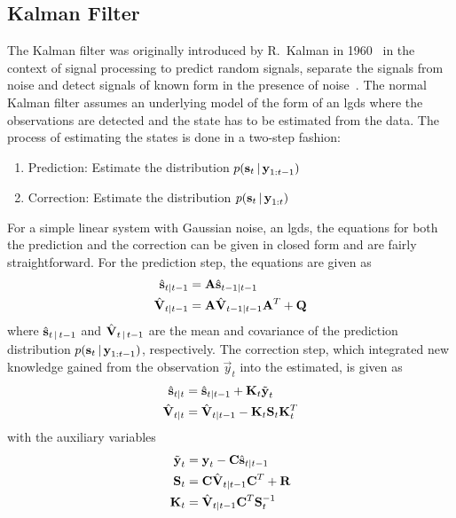 	\subsection{Kalman Filter}
		The Kalman filter was originally introduced by R.~Kalman in 1960~\cite{kalmanNewApproachLinear1960} in the context of signal processing to predict random signals, separate the signals from noise and detect signals of known form in the presence of noise~\cite{kalmanNewApproachLinear1960}. The normal Kalman filter assumes an underlying model of the form of an \ac{lgds} where the observations are detected and the state has to be estimated from the data. The process of estimating the states is done in a two-step fashion:
		\begin{enumerate}
			\item Prediction: \tabto{2.5cm} Estimate the distribution \( p(\boldsymbol{\mathrm{s}}_t \,\vert\, \boldsymbol{\mathrm{y}}_{1:t - 1}) \)
			\item Correction: \tabto{2.5cm} Estimate the distribution \( p(\boldsymbol{\mathrm{s}}_t \,\vert\, \boldsymbol{\mathrm{y}}_{1:t}) \)
		\end{enumerate}
		For a simple linear system with Gaussian noise, \ie an \ac{lgds}, the equations for both the prediction and the correction can be given in closed form and are fairly straightforward. For the prediction step, the equations are given as
		\begin{align}
			\hat{\boldsymbol{\mathrm{s}}}_{t \vert t - 1} &= \boldsymbol{\mathrm{A}} \hat{\boldsymbol{\mathrm{s}}}_{t - 1 \vert t - 1}  \label{eqn:kfStatePre} \\
			\hat{\boldsymbol{\mathrm{V}}}_{t \vert t - 1} &= \boldsymbol{\mathrm{A}} \hat{\boldsymbol{\mathrm{V}}}_{t - 1 \vert t - 1} \boldsymbol{\mathrm{A}}^T + \boldsymbol{\mathrm{Q}}  \label{eqn:kfCovPre}
		\end{align}
		where \( \hat{\boldsymbol{\mathrm{s}}}_{t \,\vert\, t - 1} \) and \( \hat{\boldsymbol{\mathrm{V}}}_{t \,\vert\, t - 1} \) are the mean and covariance of the prediction distribution \( p(\boldsymbol{\mathrm{s}}_t \,\vert\, \boldsymbol{\mathrm{y}}_{1:t - 1}) \), respectively. The correction step, which integrated new knowledge gained from the observation \( \vec{y}_t \) into the estimated, is given as
		\begin{align}
			\hat{\boldsymbol{\mathrm{s}}}_{t \vert t} &= \hat{\boldsymbol{\mathrm{s}}}_{t \vert t - 1} + \boldsymbol{\mathrm{K}}_t \tilde{\boldsymbol{\mathrm{y}}}_t  \label{eqn:kfStatePost} \\
			\hat{\boldsymbol{\mathrm{V}}}_{t \vert t} &= \hat{\boldsymbol{\mathrm{V}}}_{t \vert t - 1} - \boldsymbol{\mathrm{K}}_t \boldsymbol{\mathrm{S}}_t \boldsymbol{\mathrm{K}}_t^T  \label{eqn:kfCovPost}
		\end{align}
		with the auxiliary variables
		\begin{align}
			\tilde{\boldsymbol{\mathrm{y}}}_t &= \boldsymbol{\mathrm{y}}_t - \boldsymbol{\mathrm{C}} \hat{\boldsymbol{\mathrm{s}}}_{t \vert t - 1}  \label{eqn:kfInno} \\
			\boldsymbol{\mathrm{S}}_t &= \boldsymbol{\mathrm{C}} \hat{\boldsymbol{\mathrm{V}}}_{t \vert t - 1} \boldsymbol{\mathrm{C}}^T + \boldsymbol{\mathrm{R}}  \label{eqn:kfResCov} \\
			\boldsymbol{\mathrm{K}}_t &= \hat{\boldsymbol{\mathrm{V}}}_{t \vert t - 1} \boldsymbol{\mathrm{C}}^T \boldsymbol{\mathrm{S}}_t^{-1}  \label{eqn:kfKalmanGain}
		\end{align}
